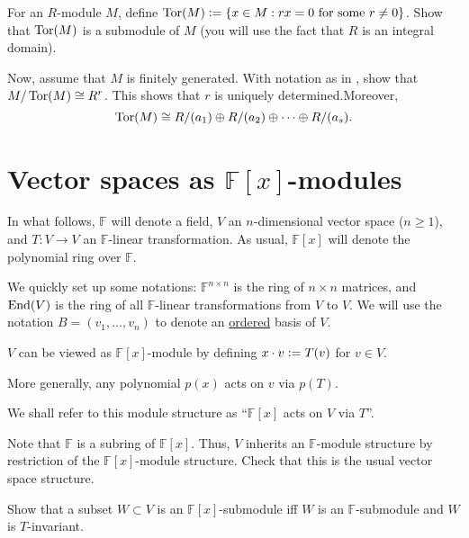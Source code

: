 \documentclass[12pt]{article}
\begin{document}
\begin{exe}
	For an $R$-module $M$, define $\operatorname{Tor}(M) \vcentcolon= \{x \in M : rx = 0 \text{ for some $r \neq 0$}\}$. Show that $\operatorname{Tor}(M)$ is a submodule of $M$ (you will use the fact that $R$ is an integral domain).

	Now, assume that $M$ is finitely generated. With notation as in , show that $M/\operatorname{Tor}(M) \cong R^{r}$. This shows that $r$ is uniquely determined.\footnotemark Moreover, 
	\begin{equation*} 
		\operatorname{Tor}(M) \cong R/(a_{1}) \oplus R/(a_{2}) \oplus \cdots \oplus R/(a_{s}).
	\end{equation*}
\end{exe}

\section{Vector spaces as \texorpdfstring{$\mathbb{F}[x]$}{F[x]}-modules}

In what follows, $\mathbb{F}$ will denote a field, $V$ an $n$-dimensional vector space ($n \ge 1$), and $T : V \to V$ an $\mathbb{F}$-linear transformation. As usual, $\mathbb{F}[x]$ will denote the polynomial ring over $\mathbb{F}$.

We quickly set up some notations: $\mathbb{F}^{n \times n}$ is the ring of $n \times n$ matrices, and $\operatorname{End}(V)$ is the ring of all $\mathbb{F}$-linear transformations from $V$ to $V$. \newline
We will use the notation $B = (v_{1}, \ldots, v_{n})$ to denote an \underline{ordered} basis of $V$.

\begin{obs}
	$V$ can be viewed as $\mathbb{F}[x]$-module by defining $x \cdot v \vcentcolon= T(v)$ for $v \in V$. 

	More generally, any polynomial $p(x)$ acts on $v$ via $p(T)$.

	We shall refer to this module structure as ``$\mathbb{F}[x]$ acts on $V$ via $T$''.
\end{obs}

\begin{exe} \label{exe:Fx-submodule}
	Note that $\mathbb{F}$ is a subring of $\mathbb{F}[x]$. Thus, $V$ inherits an $\mathbb{F}$-module structure by restriction of the $\mathbb{F}[x]$-module structure. Check that this is the usual vector space structure.

	Show that a subset $W \subset V$ is an $\mathbb{F}[x]$-submodule iff $W$ is an $\mathbb{F}$-submodule and $W$ is $T$-invariant.\footnotemark
\end{exe}
\end{document}
